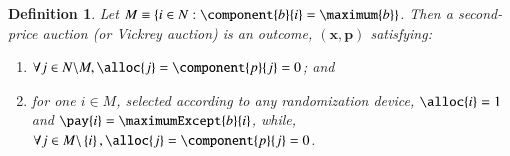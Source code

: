 \documentclass[12pt,a4paper]{scrartcl}
\newtheorem{definition}{Definition}
\theoremstyle{remark} %
\begin{document}

\begin{module}[id=second-price-auction]
  \begin{definition}
    Let $M \equiv \left\{ i \in N : \component{b}{i} = \maximum{b} \right\}$. Then a \emph{second-price auction} (or \emph{Vickrey auction}) is an outcome, $\left( \bm{x}, \bm{p} \right)$ satisfying:
    \begin{enumerate}
    \item $\forall j \in N \backslash M, \alloc{j} = \component{p}{j} = 0$; and
    \item for one $i \in M$, selected according to any randomization device, $\alloc{i} = 1$ and $\pay{i} = \maximumExcept{b}{i}$, while, $\forall j \in M \backslash \left\{ i \right\}, \alloc{j} = \component{p}{j} = 0$.
    \end{enumerate}
  \end{definition}
\end{module}
\end{document}
